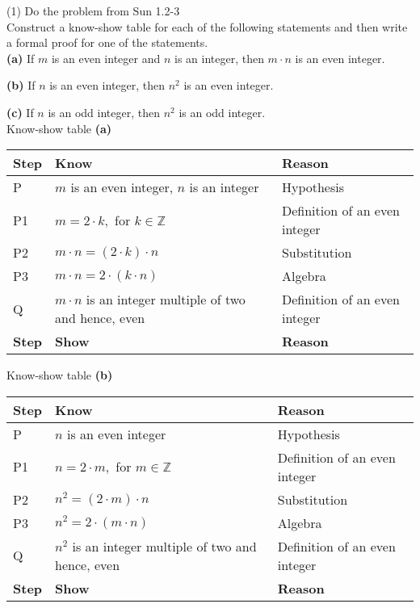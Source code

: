 \documentclass{article}
\begin{document}
(1) Do the problem from Sun 1.2-3\\

Construct a know-show table for each of the following statements and then write a formal proof for one of the statements.\\

\textbf{(a)} If $m$ is an even integer and $n$ is an integer, then $m \cdot n$ is an even integer.

\textbf{(b)} If $n$ is an even integer, then $n^{2}$ is an even integer.

\textbf{(c)} If $n$ is an odd integer, then $n^{2}$ is an odd integer.\\

Know-show table \textbf{(a)}
\begin{center}
\begin{tabular}{ | l | l | l | }
\hline
\textbf{Step} & \textbf{Know} & \textbf{Reason}\\
\hline
P  & $m$ is an even integer, $n$ is an integer  & Hypothesis\\
\hline
P1 & $m = 2 \cdot k,$ for $k \in \mathbb{Z}$ & Definition of an even integer\\
\hline
P2 & $m \cdot n = (2 \cdot k) \cdot n$ & Substitution\\
\hline 
P3 & $m \cdot n = 2 \cdot (k \cdot n)$ & Algebra\\
\hline
Q & $m \cdot n$ is an integer multiple of two and hence, even & Definition of an even integer\\
\hline
\textbf{Step} & \textbf{Show} & \textbf{Reason}\\
\hline
\end{tabular}
\end{center}

Know-show table \textbf{(b)}
\begin{center}
\begin{tabular}{ | l | l | l | }
\hline
\textbf{Step} & \textbf{Know} & \textbf{Reason}\\
\hline
P  & $n$ is an even integer & Hypothesis\\
\hline
P1 & $n = 2 \cdot m,$ for $m \in \mathbb{Z}$ & Definition of an even integer\\
\hline
P2 & $n^2 = (2 \cdot m) \cdot n$ & Substitution\\
\hline 
P3 & $n^2 = 2 \cdot (m \cdot n)$ & Algebra\\
\hline
Q & $n^2$ is an integer multiple of two and hence, even & Definition of an even integer\\
\hline
\textbf{Step} & \textbf{Show} & \textbf{Reason}\\
\hline
\end{tabular}
\end{center}
\end{document}
